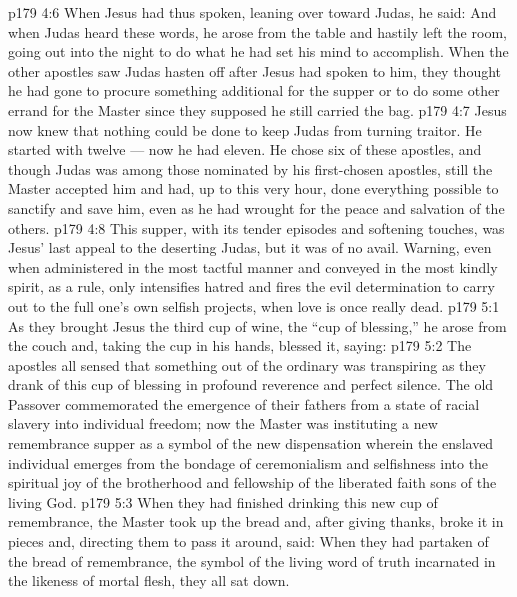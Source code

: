 \vs p179 4:6 When Jesus had thus spoken, leaning over toward Judas, he said:  And when Judas heard these words, he arose from the table and hastily left the room, going out into the night to do what he had set his mind to accomplish. When the other apostles saw Judas hasten off after Jesus had spoken to him, they thought he had gone to procure something additional for the supper or to do some other errand for the Master since they supposed he still carried the bag.
\vs p179 4:7 \pc Jesus now knew that nothing could be done to keep Judas from turning traitor. He started with twelve --- now he had eleven. He chose six of these apostles, and though Judas was among those nominated by his first\hyp{}chosen apostles, still the Master accepted him and had, up to this very hour, done everything possible to sanctify and save him, even as he had wrought for the peace and salvation of the others.
\vs p179 4:8 This supper, with its tender episodes and softening touches, was Jesus’ last appeal to the deserting Judas, but it was of no avail. Warning, even when administered in the most tactful manner and conveyed in the most kindly spirit, as a rule, only intensifies hatred and fires the evil determination to carry out to the full one’s own selfish projects, when love is once really dead.
\vs p179 5:1 As they brought Jesus the third cup of wine, the “cup of blessing,” he arose from the couch and, taking the cup in his hands, blessed it, saying: 
\vs p179 5:2 The apostles all sensed that something out of the ordinary was transpiring as they drank of this cup of blessing in profound reverence and perfect silence. The old Passover commemorated the emergence of their fathers from a state of racial slavery into individual freedom; now the Master was instituting a new remembrance supper as a symbol of the new dispensation wherein the enslaved individual emerges from the bondage of ceremonialism and selfishness into the spiritual joy of the brotherhood and fellowship of the liberated faith sons of the living God.
\vs p179 5:3 When they had finished drinking this new cup of remembrance, the Master took up the bread and, after giving thanks, broke it in pieces and, directing them to pass it around, said:  When they had partaken of the bread of remembrance, the symbol of the living word of truth incarnated in the likeness of mortal flesh, they all sat down.
